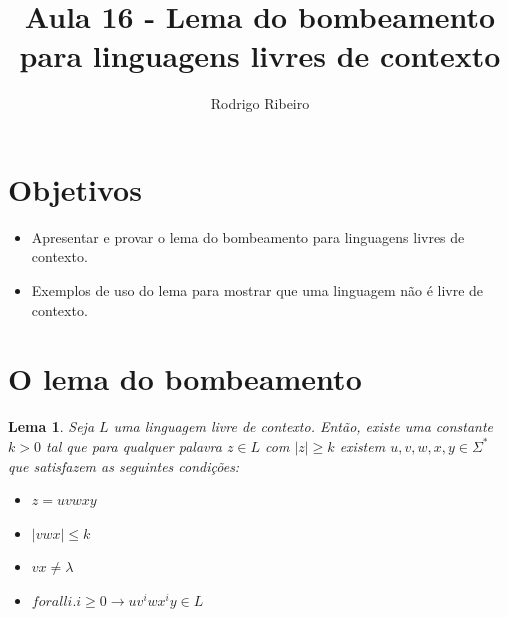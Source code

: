 \documentclass[a4paper]{article}
\newtheorem{Lemma}{Lema}
\theoremstyle{definition}
\begin{document}
  \title{Aula 16 - Lema do bombeamento para linguagens livres de contexto}
  \author{Rodrigo Ribeiro}

  \maketitle


  \pagestyle{fancy}


  \section*{Objetivos}

  \begin{itemize}
     \item Apresentar e provar o lema do bombeamento para linguagens livres de contexto.
     \item Exemplos de uso do lema para mostrar que uma linguagem não é livre de contexto.   
  \end{itemize}

  \section{O lema do bombeamento}

  \begin{Lemma}
    Seja $L$ uma linguagem livre de contexto. Então, existe uma constante $k >
    0$ tal que para qualquer  palavra $z \in L$ com $|z| \geq k$ existem
    $u,v,w,x,y \in \Sigma^*$ que satisfazem as seguintes condições:
    \begin{itemize}
      \item $z = uvwxy$
      \item $|vwx| \leq k$
      \item $vx \neq \lambda$
      \item $forall i. i \geq 0 \to uv^iwx^iy \in L$
    \end{itemize}
  \end{Lemma}
\end{document}
